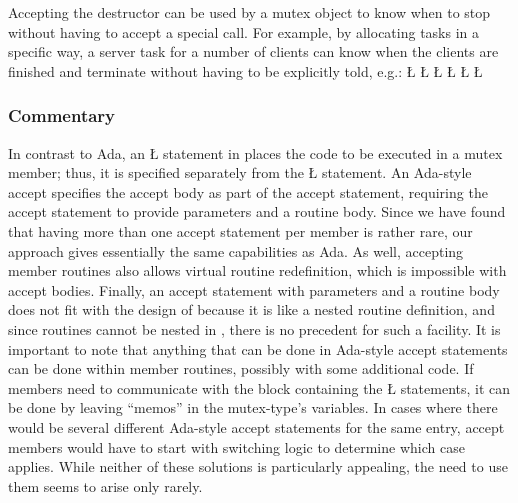 \documentclass[openright,twoside]{report}
\begin{document}
Accepting the destructor can be used by a mutex object to know when to stop without having to accept a special call.
For example, by allocating tasks in a specific way, a server task for a number of clients can know when the clients are finished and terminate without having to be explicitly told, e.g.:
\LGinlinefalse\LGbegin\lgrinde
\L{\LB{\{}}
\L{\LB{}}
\CE{}\L{\LB{}}
\L{\LB{}}
\CE{}\L{\LB{}}
\CE{}\L{}
\CE{}\endlgrinde\LGend


\subsubsection{Commentary}

In contrast to Ada, an \LGinlinetrue\LGbegin\lgrinde\L{}\endlgrinde\LGend{} statement in \uC places the code to be executed in a mutex member;
thus, it is specified separately from the \LGinlinetrue\LGbegin\lgrinde\L{}\endlgrinde\LGend{} statement.
An Ada-style accept specifies the accept body as part of the accept statement, requiring the accept statement to provide parameters and a routine body.
Since we have found that having more than one accept statement per member is rather rare, our approach gives essentially the same capabilities as Ada.
As well, accepting member routines also allows virtual routine redefinition, which is impossible with accept bodies.
Finally, an accept statement with parameters and a routine body does not fit with the design of \CC because it is like a nested routine definition, and since routines cannot be nested in \CC, there is no precedent for such a facility.
It is important to note that anything that can be done in Ada-style accept statements can be done within member routines, possibly with some additional code.
If members need to communicate with the block containing the \LGinlinetrue\LGbegin\lgrinde\L{}\endlgrinde\LGend{} statements, it can be done by leaving ``memos'' in the mutex-type's variables.
In cases where there would be several different Ada-style accept statements for the same entry, accept members would have to start with switching logic to determine which case applies.
While neither of these solutions is particularly appealing, the need to use them seems to arise only rarely.
\end{document}
